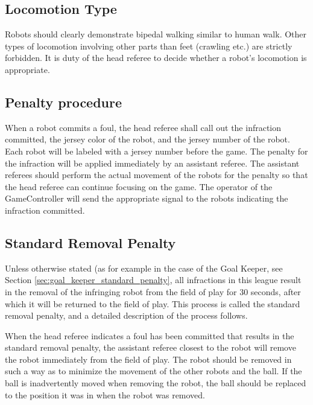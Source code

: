 \documentclass[12pt]{article}
\begin{document}
\subsection{Locomotion Type}
\label{sec:locomotion_type}

Robots should clearly demonstrate bipedal walking similar to human walk. Other types of locomotion involving other parts than feet (crawling etc.) are strictly forbidden. It is duty of the head referee to decide whether a robot's locomotion is appropriate.

\subsection{Penalty procedure}
\label{sec:penalty_procedure}

When a robot commits a foul, the head referee shall call out the infraction committed, the jersey color of the robot, and the jersey number of the robot. Each robot will be labeled with a jersey number before the game. The penalty for the infraction will be applied immediately by an assistant referee. The assistant referees should perform the actual movement of the robots for the penalty so that the head referee can continue focusing on the game. The operator of the GameController will send the appropriate signal to the robots indicating the infraction committed.

\subsection{Standard Removal Penalty}
\label{sec:removal_penalty}

Unless otherwise stated (as for example in the case of the Goal Keeper, see Section \ref{sec:goal_keeper_standard_penalty}, all infractions in this league result in the removal of the infringing robot from the field of play for 30 seconds, after which it will be returned to the field of play. This process is called the standard removal penalty, and a detailed description of the process follows.

When the head referee indicates a foul has been committed that results in the standard removal penalty, the assistant referee closest to the robot will remove the robot immediately from the field of play. The robot should be removed in such a way as to minimize the movement of the other robots and the ball. If the ball is inadvertently moved when removing the robot, the ball should be replaced to the position it was in when the robot was removed.
\end{document}

